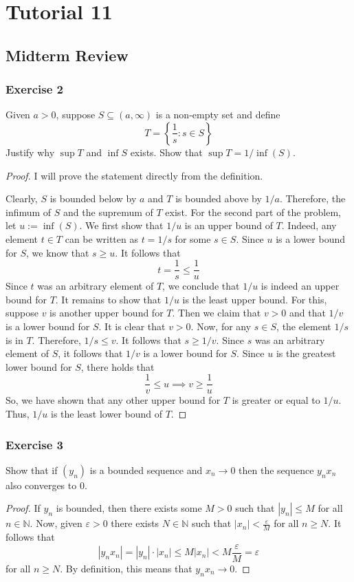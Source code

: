 \documentclass[12pt, reqno]{article}
\numberwithin{equation}{section}
\theoremstyle{definition}
\theoremstyle{remark}
\newcommand{\NN}{\mathbb{N}}
\newcommand{\set}[1]{\left\{#1\right\}}
\newcommand{\abs}[1]{\left\lvert#1\right\rvert}
\renewcommand{\epsilon}{\varepsilon}
\begin{document}
\section*{Tutorial 11}

\subsection*{Midterm Review}

\subsubsection*{Exercise 2} Given $a>0$, suppose $S \subseteq (a, \infty)$ is a non-empty set and define
\[
	T = \set{\frac{1}{s} :  s\in S}
\]
Justify why $\sup T$ and $\inf S$ exists. Show that $\sup T = 1/\inf(S)$.

\begin{proof} I will prove the statement directly from the definition.

	Clearly, $S$ is bounded below by $a$ and $T$ is bounded above by $1/a$. Therefore, the infimum of $S$ and the supremum of $T$ exist. For the second part of the problem, let $u:=\inf(S)$. We first show that $1/u$ is an upper bound of $T$. Indeed, any element $t\in T$ can be written as $t = 1/s$ for some $s\in S$.  Since $u$ is a lower bound for $S$, we know that $s \geq u$. It follows that
	\[
		t = \frac{1}{s} \leq \frac{1}{u}
	\]
	Since $t$ was an arbitrary element of $T$, we conclude that $1/u$ is indeed an upper bound for $T$. It remains to show that $1/u$ is the least upper bound. For this, suppose $v$ is another upper bound for $T$. Then we claim that $v > 0$ and that $1/v$ is a lower bound for $S$. It is clear that $v>0$. Now, for any $s\in S$, the element $1/s$ is in $T$. Therefore, $1/s\leq v$.  It follows that $s \geq 1/v$. Since $s$ was an arbitrary element of $S$, it follows that $1/v$ is a lower bound for $S$. Since $u$ is the greatest lower bound for $S$, there holds that
	\[
		\frac{1}{v} \leq u \implies v \geq \frac{1}{u}
	\]
	So, we have shown that any other upper bound for $T$ is greater or equal to $1/u$. Thus, $1/u$ is the least lower bound of $T$.
\end{proof}

\subsubsection*{Exercise 3} Show that if $(y_n)$ is a bounded sequence and $x_n \to 0$ then the sequence $y_nx_n$ also converges to 0.
\begin{proof}
	If $y_n$ is bounded, then there exists some $M>0$ such that $\abs{y_n} \leq M$ for all $n\in \NN$. Now, given $\epsilon>0$ there exists $N\in \NN$ such that $\abs{x_n} < \frac{\epsilon}{M}$ for all $n\geq N$. It follows that
	\[
		\abs{y_nx_n} = \abs{y_n}\cdot\abs{x_n} \leq M \abs{x_n} < M\frac{\epsilon}{M} = \epsilon
	\]
	for all $n\geq N$. By definition, this means that $y_nx_n \to 0$.
\end{proof}
\end{document}

